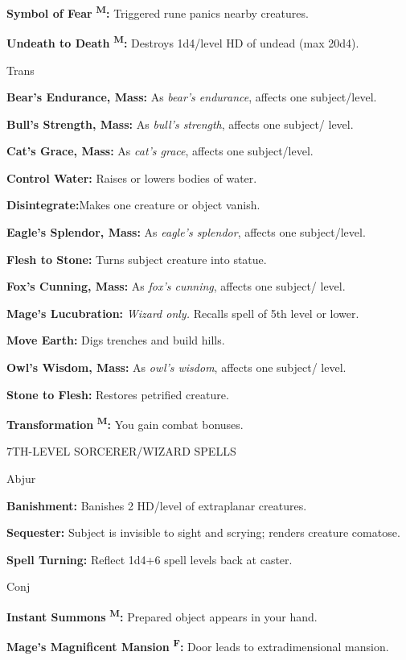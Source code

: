 \documentclass{article}
\begin{document}
\textbf{Symbol of Fear }\textsuperscript{\textbf{M}}\textbf{:} Triggered rune panics 
nearby creatures.

\textbf{Undeath to Death }\textsuperscript{\textbf{M}}\textbf{:} Destroys 1d4/level 
HD of undead (max 20d4).

Trans

\textbf{Bear's Endurance, Mass:} As \textit{bear's endurance}, affects one subject/level.

\textbf{Bull's Strength, Mass:} As \textit{bull's strength}, affects one subject/ 
level.

\textbf{Cat's Grace, Mass:} As \textit{cat's grace}, affects one subject/level.

\textbf{Control Water:} Raises or lowers bodies of water.

\textbf{Disintegrate:}Makes one creature or object vanish.

\textbf{Eagle's Splendor, Mass:} As \textit{eagle's splendor}, affects one subject/level.

\textbf{Flesh to Stone:} Turns subject creature into statue.

\textbf{Fox's Cunning, Mass:} As \textit{fox's cunning}, affects one subject/ level.

\textbf{Mage's Lucubration:} \textit{Wizard only. }Recalls spell of 5th level or 
lower.

\textbf{Move Earth:} Digs trenches and build hills.

\textbf{Owl's Wisdom, Mass:} As \textit{owl's wisdom}, affects one subject/ level.

\textbf{Stone to Flesh:} Restores petrified creature.

\textbf{Transformation }\textsuperscript{\textbf{M}}\textbf{:} You gain combat 
bonuses.

7TH-LEVEL SORCERER/WIZARD SPELLS

Abjur

\textbf{Banishment:} Banishes 2 HD/level of extraplanar creatures.

\textbf{Sequester:} Subject is invisible to sight and scrying; renders creature 
comatose.

\textbf{Spell Turning:} Reflect 1d4+6 spell levels back at caster.

Conj

\textbf{Instant Summons }\textsuperscript{\textbf{M}}\textbf{:} Prepared object 
appears in your hand.

\textbf{Mage's Magnificent Mansion }\textsuperscript{\textbf{F}}\textbf{:} Door 
leads to extradimensional mansion.
\end{document}
